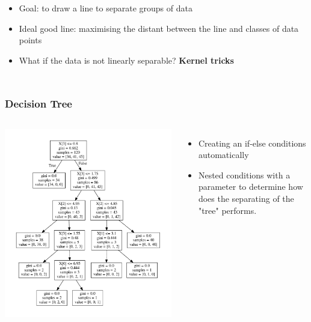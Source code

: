 \documentclass[aspectratio=169]{beamer}
\begin{document}
\begin{frame}
\begin{columns}
		\begin{itemize}
			\item Goal: to draw a line to separate groups of data
			\item Ideal good line: maximising the distant between the line and classes of data points
			\item What if the data is not linearly separable? \textbf{Kernel tricks}
		\end{itemize}
	\end{columns}
\end{frame}

\begin{frame}
	\frametitle{Decision Tree}
	\begin{columns}
		\includegraphics[width=1.0\textwidth]{imgs/decision_tree.pdf}
		\begin{itemize}
			\item Creating an if-else conditions automatically
			\item Nested conditions with a parameter to determine how does the separating of the "tree" performs.
		\end{itemize}
	\end{columns}
\end{frame}
\end{document}
